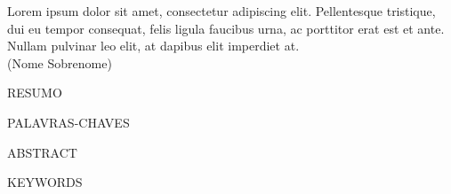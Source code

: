 \documentclass[12pt,nodisplayskipstretch]{article}
\begin{document}
\newpage
\thispagestyle{empty}
\vspace*{\fill}
\hspace{44mm}
\begin{minipage}{10cm}
\begin{flushright}
Lorem ipsum dolor sit amet, consectetur adipiscing elit. Pellentesque tristique, dui eu tempor consequat, felis ligula faucibus urna, ac porttitor erat est et ante. Nullam pulvinar leo elit, at dapibus elit imperdiet at.\\(Nome Sobrenome)
\end{flushright}
\end{minipage}

\newpage
\thispagestyle{empty}
\begin{center}
    \uppercase{Resumo}
\end{center}
\lipsum[1]

\begin{center}
    \uppercase{Palavras-chaves}
\end{center}


\newpage
\thispagestyle{empty}
\begin{center}
    \uppercase{Abstract}
\end{center}
\lipsum[1]

\begin{center}
    \uppercase{Keywords}
\end{center}

\newpage
\thispagestyle{empty}
\listoffigures
\newpage

\newpage
\thispagestyle{empty}
\listoftables
\newpage

\thispagestyle{empty}
\printnomenclature
\newpage


\newpage

\thispagestyle{empty}
\tableofcontents
\newpage
\end{document}
